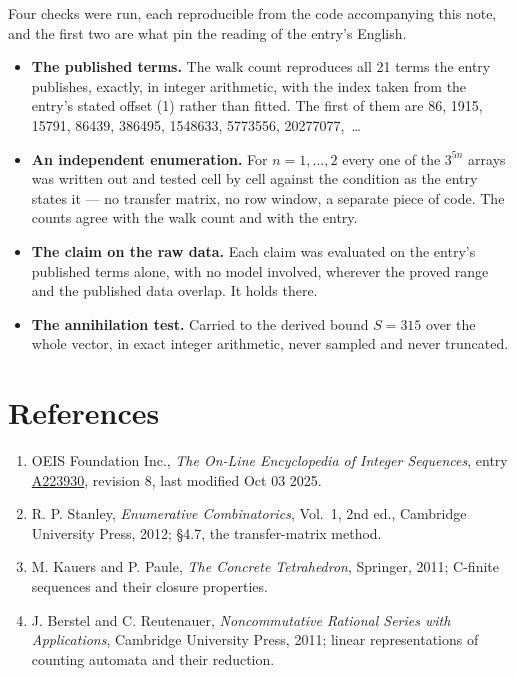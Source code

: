 \documentclass[11pt]{article}
\theoremstyle{definition}
\begin{document}
Four checks were run, each reproducible from the code accompanying this note, and the first two are what pin the reading of the entry's English.

\begin{itemize}

\item {\bfseries The published terms.} The walk count reproduces all 21 terms the entry publishes, exactly, in integer arithmetic, with the index taken from the entry's stated offset (1) rather than fitted. The first of them are 86, 1915, 15791, 86439, 386495, 1548633, 5773556, 20277077,~\dots

\item {\bfseries An independent enumeration.} For $n = 1,\dots,2$ every one of the $3^{5n}$ arrays was written out and tested cell by cell against the condition as the entry states it --- no transfer matrix, no row window, a separate piece of code. The counts agree with the walk count and with the entry.

\item {\bfseries The claim on the raw data.} Each claim was evaluated on the entry's published terms alone, with no model involved, wherever the proved range and the published data overlap. It holds there.

\item {\bfseries The annihilation test.} Carried to the derived bound $S = 315$ over the whole vector, in exact integer arithmetic, never sampled and never truncated.

\end{itemize}

\section{References}

\begin{enumerate}

\item OEIS Foundation Inc., \emph{The On-Line Encyclopedia of Integer Sequences}, entry \href{https://oeis.org/A223930}{A223930}, revision 8, last modified Oct 03 2025.

\item R. P. Stanley, \emph{Enumerative Combinatorics}, Vol.~1, 2nd ed., Cambridge University Press, 2012; \S4.7, the transfer-matrix method.

\item M. Kauers and P. Paule, \emph{The Concrete Tetrahedron}, Springer, 2011; C-finite sequences and their closure properties.

\item J. Berstel and C. Reutenauer, \emph{Noncommutative Rational Series with Applications}, Cambridge University Press, 2011; linear representations of counting automata and their reduction.

\end{enumerate}
\end{document}
